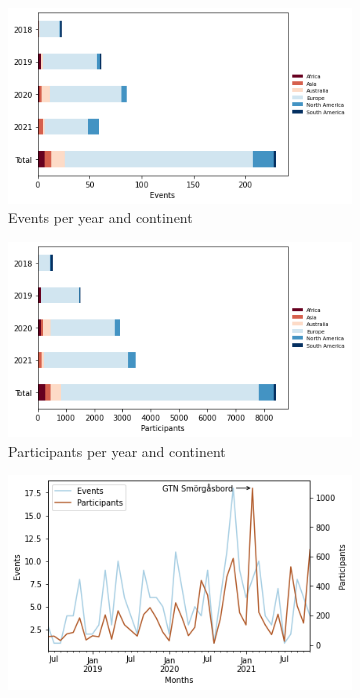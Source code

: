 \documentclass[10pt,letterpaper]{article}
\begin{document}
\begin{figure}[!ht]
    \centering
    \begin{subfigure}[b]{0.45\textwidth}
         \centering
         \includegraphics[width=\textwidth]{images/tiaas-events-per-year.png}
         \caption{Events per year and continent}
         \label{fig:tiaas-events-per-year}
    \end{subfigure}
    \hfill
    \begin{subfigure}[b]{0.45\textwidth}
         \centering
         \includegraphics[width=\textwidth]{images/tiaas-participants-per-year.png}
         \caption{Participants per year and continent}
         \label{fig:tiaas-participants-per-year}
    \end{subfigure}
    \hfill
    \begin{subfigure}[b]{0.45\textwidth}
         \centering
         \includegraphics[width=\textwidth]{images/tiaas-events.png}

\end{subfigure}
\end{figure}
\end{document}
